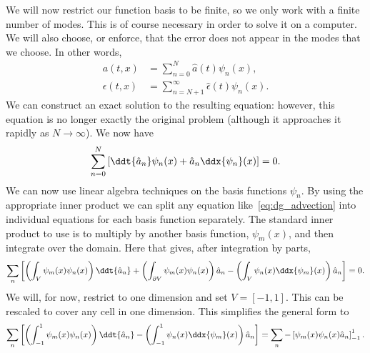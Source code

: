 We will now restrict our function basis to be finite, so we only work with a
finite number of modes. This is of course necessary in order to solve it on a
computer. We will also choose, or enforce, that the error does not appear in the
modes that we choose. In other words,
%
\begin{align}
  a(t, x) &= \sum_{n=0}^N \hat{a}(t) \psi_n(x), \\
  \epsilon(t, x) &= \sum_{n=N+1}^{\infty} \hat{\epsilon}(t) \psi_n(x).
\end{align}
%
We can construct an exact solution to the resulting equation: however, this
equation is no longer exactly the original problem (although it approaches it
rapidly as $N \to \infty$). We now have
%
\begin{equation}
  \label{eq:dg_advection2}
  \sum_{n=0}^{N} \left[ \ddt{\hat{a}_n} \psi_n(x) + \hat{a}_n \ddx{\psi_n}(x) \right] = 0.
\end{equation}
%
We can now use linear algebra techniques on the basis functions $\psi_n$. By using
the appropriate inner product we can split any equation like~\ref{eq:dg_advection}
into individual equations for each basis function separately. The standard inner
product to use is to multiply by another basis function, $\psi_m(x)$, and then
integrate over the domain. Here that gives, after integration by parts,
%
\begin{equation}
  \label{eq:dg_advection3}
  \sum_n \left[ \left( \int_V \psi_m(x) \psi_n(x) \right) \ddt{\hat{a}_n} + \left( \int_{\partial V} \psi_m(x) \psi_n(x) \right) \hat{a}_n - \left( \int_V \psi_n(x) \ddx{\psi_m}(x) \right) \hat{a}_n \right] = 0.
\end{equation}
%
We will, for now, restrict to one dimension and set $V = [-1, 1]$. This can be
rescaled to cover any cell in one dimension. This simplifies the general form to
%
\begin{equation}
  \label{eq:dg_advection4}
  \sum_n \left[ \left( \int_{-1}^1 \psi_m(x) \psi_n(x) \right) \ddt{\hat{a}_n} - \left( \int_{-1}^1 \psi_n(x) \ddx{\psi_m}(x) \right) \hat{a}_n \right] = \sum_n -\left[ \psi_m(x) \psi_n(x) \hat{a}_n \right]_{-1}^1.
\end{equation}
%

